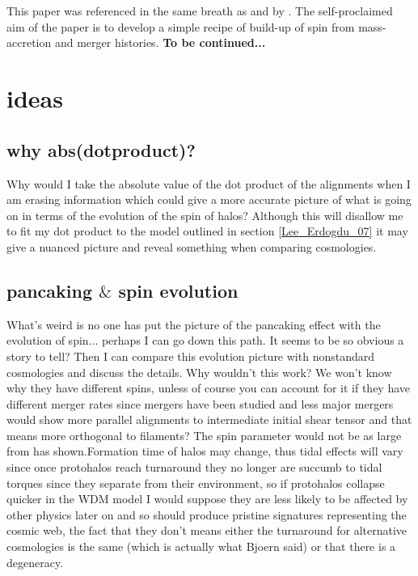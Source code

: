 \documentclass[fleqn,usenatbib]{mnras}
\begin{document}
\section{\citet{Maller_02}}
This paper was referenced in the same breath as \citet{Gardner_01} and \citet{Vitvitska02} by \citet{Trowland_13}.
The self-proclaimed aim of the paper is to develop a simple recipe of build-up of spin from mass-accretion and merger histories. \textbf{To be continued...}





\section{ideas}
\subsection{why abs(dotproduct)?}
Why would I take the absolute value of the dot product of the alignments when I am erasing information which could give a more accurate picture of what is going on in terms of the evolution of the spin of halos? Although this will disallow me to fit my dot product to the model outlined in section \ref{Lee_Erdogdu_07} it may give a nuanced picture and reveal something when comparing cosmologies.

\subsection{pancaking $\&$ spin evolution}
What's weird is no one has put the picture of the pancaking effect with the evolution of spin... perhaps I can go down this path. It seems to be so obvious a story to tell? Then I can compare this evolution picture with nonstandard cosmologies and discuss the details.
Why wouldn't this work? We won't know why they have different spins, unless of course you can account for it if they have different merger rates since mergers have been studied and less major mergers would show more parallel alignments to intermediate initial shear tensor and that means more orthogonal to filaments? The spin parameter would not be as large from \citet{Gardner_01} has shown.Formation time of halos may change, thus tidal effects will vary since once protohalos reach turnaround they no longer are succumb to tidal torques since they separate from their environment, so if protohalos collapse quicker in the WDM model I would suppose they are less likely to be affected by other physics later on and so should produce pristine signatures representing the cosmic web, the fact that they don't means either the turnaround for alternative cosmologies is the same (which is actually what Bjoern said) or that there is a degeneracy. 

 



\bsp	%
\label{lastpage}
\end{document}
